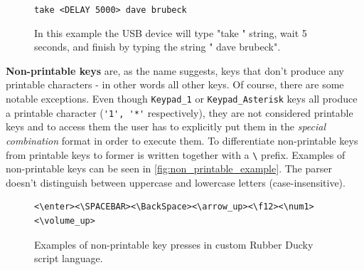 \begin{figure}[ht]
\label{fig:delay_example}
\centering
\begin{varwidth}{\linewidth}
\verb|take <DELAY 5000> dave brubeck|
\end{varwidth}
\caption{In this example the USB device will type "take " string, wait 5 seconds, and finish by typing the string " dave brubeck".}
\end{figure}

\textbf{Non-printable keys} are, as the name suggests, keys that don't produce any printable characters \-- in other words all other keys. Of course, there are some notable exceptions. Even though \verb|Keypad_1| or \verb|Keypad_Asterisk| keys all produce a printable character (\verb|'1', '*'| respectively), they are not considered printable keys and to access them the user has to explicitly put them in the \emph{special combination} format in order to execute them. To differentiate non-printable keys from printable keys to former is written together with a \verb|\| prefix. Examples of non-printable keys can be seen in \autoref{fig:non_printable_example}. The parser doesn't distinguish between uppercase and lowercase letters (case-insensitive).

\begin{figure}[ht]
\label{fig:non_printable_example}
\centering
\begin{varwidth}{\linewidth}
\begin{verbatim}
<\enter><\SPACEBAR><\BackSpace><\arrow_up><\f12><\num1><\volume_up>
\end{verbatim}
\end{varwidth}
\caption{Examples of non-printable key presses in custom Rubber Ducky script language.}
\end{figure}

